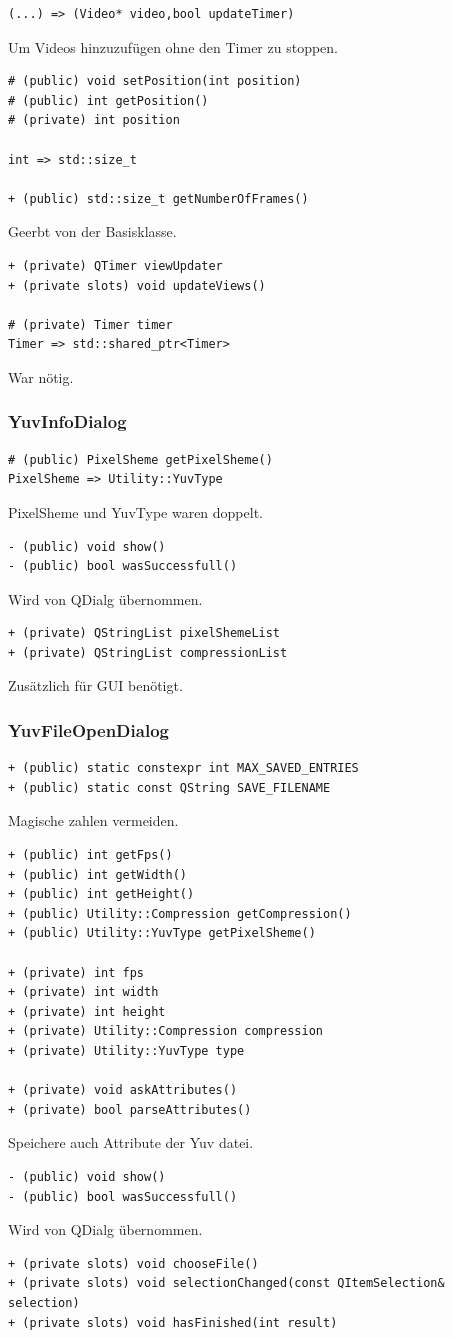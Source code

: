 \documentclass{scrartcl}
\begin{document}
{\begin{verbatim}
(...) => (Video* video,bool updateTimer)
\end{verbatim}
Um Videos hinzuzufügen ohne den Timer zu stoppen.
\bigskip
\begin{verbatim}
# (public) void setPosition(int position)
# (public) int getPosition()
# (private) int position

int => std::size_t

+ (public) std::size_t getNumberOfFrames()
\end{verbatim}
Geerbt von der Basisklasse.
\bigskip
\begin{verbatim}
+ (private) QTimer viewUpdater
+ (private slots) void updateViews()

# (private) Timer timer
Timer => std::shared_ptr<Timer>
\end{verbatim}
War nötig.
\bigskip
\subsubsection{YuvInfoDialog}
\begin{verbatim}
# (public) PixelSheme getPixelSheme()
PixelSheme => Utility::YuvType
\end{verbatim}
PixelSheme und YuvType waren doppelt.
\bigskip
\begin{verbatim}
- (public) void show()
- (public) bool wasSuccessfull()
\end{verbatim}
Wird von QDialg übernommen.
\bigskip
\begin{verbatim}
+ (private) QStringList pixelShemeList
+ (private) QStringList compressionList
\end{verbatim}
Zusätzlich für GUI benötigt.
\newpage
\subsubsection{YuvFileOpenDialog}
\bigskip
\begin{verbatim}
+ (public) static constexpr int MAX_SAVED_ENTRIES
+ (public) static const QString SAVE_FILENAME
\end{verbatim}
Magische zahlen vermeiden.
\bigskip
\begin{verbatim}
+ (public) int getFps()
+ (public) int getWidth()
+ (public) int getHeight()
+ (public) Utility::Compression getCompression()
+ (public) Utility::YuvType getPixelSheme()

+ (private) int fps
+ (private) int width
+ (private) int height
+ (private) Utility::Compression compression
+ (private) Utility::YuvType type

+ (private) void askAttributes()
+ (private) bool parseAttributes()
\end{verbatim}
Speichere auch Attribute der Yuv datei.
\bigskip
\begin{verbatim}
- (public) void show()
- (public) bool wasSuccessfull()
\end{verbatim}
Wird von QDialg übernommen.
\bigskip
\begin{verbatim}
+ (private slots) void chooseFile()
+ (private slots) void selectionChanged(const QItemSelection& selection)
+ (private slots) void hasFinished(int result)


\end{verbatim}}
\end{document}
